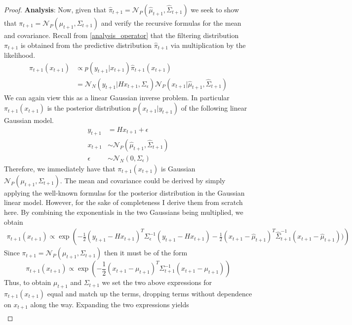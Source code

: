 \documentclass[12pt]{article}
\begin{document}
\begin{proof}
\bigskip
\noindent
\textbf{Analysis}: Now, given that $\hat{\pi}_{t + 1} = \mathcal{N}_P(\hat{\mu}_{t + 1}, \hat{\Sigma}_{t + 1})$ we seek to show that 
$\pi_{t + 1} = \mathcal{N}_P(\mu_{t + 1}, \Sigma_{t + 1})$ and verify the recursive formulas for the mean and covariance. Recall from 
\ref{analysis_operator} that the filtering distribution $\pi_{t + 1}$ is obtained from the predictive distribution $\hat{\pi}_{t + 1}$ via 
multiplication by the likelihood. 
\begin{align*}
\pi_{t + 1}(x_{t + 1}) &\propto p(y_{t + 1}|x_{t + 1})\hat{\pi}_{t + 1}(x_{t+1}) \\
			       &= \mathcal{N}_N(y_{t + 1}|H x_{t+1}, \Sigma_\epsilon) \mathcal{N}_P(x_{t + 1}|\hat{\mu}_{t + 1}, \hat{\Sigma}_{t + 1})
\end{align*}
We can again view this as a linear Gaussian inverse problem. In particular $\pi_{t + 1}(x_{t + 1})$ is the posterior distribution $p(x_{t+1}|y_{t+1})$
of the following linear Gaussian model. 
\begin{align*}
y_{t + 1} &= Hx_{t + 1} + \epsilon \\
x_{t + 1} &\sim \mathcal{N}_{P}(\hat{\mu}_{t+1}, \hat{\Sigma}_{t+1}) \\
\epsilon &\sim \mathcal{N}_N(0, \Sigma_\epsilon)
\end{align*} 
Therefore, we immediately have that $\pi_{t + 1}(x_{t + 1})$ is Gaussian $\mathcal{N}_P(\mu_{t + 1}, \Sigma_{t + 1})$. The mean and covariance could 
be derived by simply applying the well-known formulas for the posterior distribution in the Gaussian linear model. However, for the sake of completeness 
I derive them from scratch here. By combining the exponentials in the two Gaussians being multiplied, we obtain 
\begin{align*}
\pi_{t + 1}(x_{t + 1}) \propto \exp\left(-\frac{1}{2} (y_{t+1} - Hx_{t+1})^T \Sigma_\epsilon^{-1} (y_{t+1} - Hx_{t+1}) - \frac{1}{2} (x_{t+1} - \hat{\mu}_{t+1})^T \hat{\Sigma}^{-1}_{t+1} (x_{t+1} - \hat{\mu}_{t+1}) ) \right)
\end{align*}
Since $\pi_{t + 1} = \mathcal{N}_P(\mu_{t + 1}, \Sigma_{t + 1})$ then it must be of the form 
\[\pi_{t + 1}(x_{t + 1}) \propto \exp\left(-\frac{1}{2} (x_{t + 1} - \mu_{t + 1})^T \Sigma_{t+1}^{-1} (x_{t + 1} - \mu_{t + 1}) \right) \]
Thus, to obtain $\mu_{t + 1}$ and $\Sigma_{t + 1}$ we set the two above expressions for $\pi_{t + 1}(x_{t+1})$ equal and match up the terms, dropping 
terms without dependence on $x_{t+1}$ along the way. Expanding the two expressions yields
\begin{align*}

\end{align*}
\end{proof}
\end{document}
